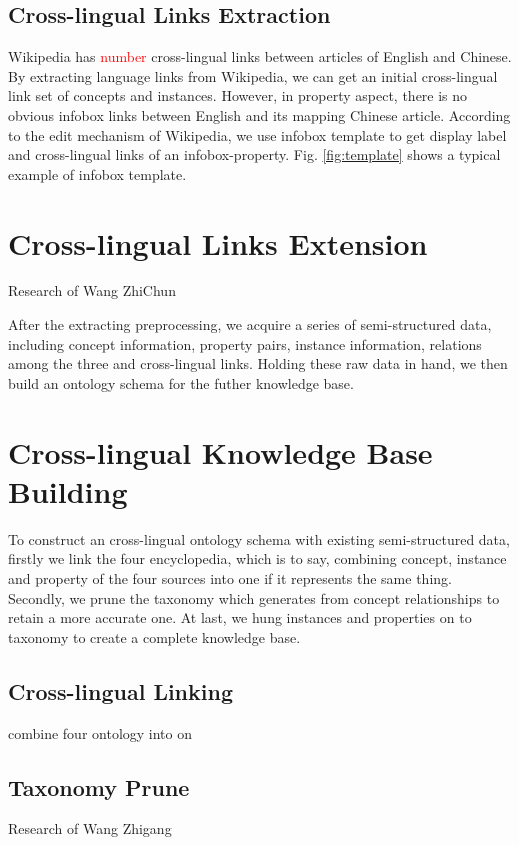 \documentclass[runningheads,a4paper]{llncs}
\begin{document}
\subsection{Cross-lingual Links Extraction}
\label{sec:cld}
Wikipedia has \textcolor{red}{number} cross-lingual links between articles of English and Chinese. By extracting language links from Wikipedia, we can get an initial cross-lingual link set of concepts and instances. 
However, in property aspect, there is no obvious infobox links between English and its mapping Chinese article. According to the edit mechanism of Wikipedia, we use infobox template to get display label and cross-lingual links of an infobox-property. Fig. \ref{fig:template} shows a typical example of infobox template. 
\section{Cross-lingual Links Extension}
\label{sec:cle}
Research of Wang ZhiChun

After the extracting preprocessing, we acquire a series of semi-structured data, including concept information, property pairs, instance information, relations among the three and cross-lingual links. Holding these raw data in hand, we then build an ontology schema for the futher knowledge base.

\section{Cross-lingual Knowledge Base Building}
To construct an cross-lingual ontology schema with existing semi-structured data, firstly we link the four encyclopedia, which is to say, combining concept, instance and property of the four sources into one if it represents the same thing. Secondly, we prune the taxonomy which generates from concept relationships to retain a more accurate one. At last, we hung instances and properties on to taxonomy to create a complete knowledge base.

\subsection{Cross-lingual Linking}
\label{sec:cld}
combine four ontology into on

\subsection{Taxonomy Prune}
\label{sec:tp}
Research of Wang Zhigang
\end{document}
